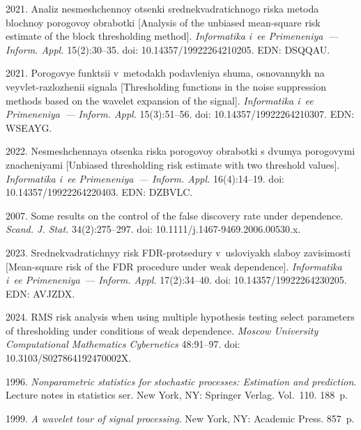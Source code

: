 \begin{multicols}{2}
{{\begin{thebibliography}{99}
 2021.
Analiz nesmeshchennoy otsenki srednekvadratichnogo riska metoda blochnoy po\-ro\-go\-voy obrabotki 
[Analysis of the unbiased mean-square risk estimate of the block thresholding method]. 
\textit{Informatika i~ee Primeneniya~--- Inform. Appl.} 15(2):30--35.
doi: 10.14357/19922264210205. EDN: DSQQAU.

 2021.
Porogovye funktsii v~metodakh podavleniya shuma, osnovannykh na veyvlet-razlozhenii signala 
[Thresholding functions in the noise suppression methods based on the wavelet expansion of the signal]. 
\textit{Informatika i~ee Primeneniya~--- Inform. Appl.} 15(3):51--56.
doi: 10.14357/19922264210307. EDN: WSEAYG.

 2022.
Nesmeshchennaya otsenka riska porogovoy obrabotki s dvumya porogovymi znacheniyami [Unbiased thresholding risk estimate with two threshold values]. 
\textit{Informatika i~ee Primeneniya~--- Inform. Appl.} 16(4):14--19.
doi: 10.14357/19922264220403. EDN: DZBVLC.

 2007. Some results on the control of the false discovery rate under dependence. 
\textit{Scand. J. Stat.} 34(2):275--297. 
doi: 10.1111/j.1467-9469.2006.00530.x.

 2023.
Sred\-ne\-kvad\-ra\-tich\-nyy risk FDR-protsedury v~usloviyakh slaboy za\-vi\-si\-mosti [Mean-square risk of the FDR procedure under weak dependence]. 
\textit{Informatika i~ee Primeneniya~--- Inform. Appl.} 17(2):34--40.
doi: 10.14357/19922264230205. EDN: AVJZDX.

 2024. 
RMS risk analysis when using multiple hypothesis testing select parameters of thresholding under conditions of weak dependence. 
\textit{Moscow University Computational Mathematics Cybernetics} 48:91--97. 
doi: 10.3103/S027864192470002X.

 1996. 
\textit{Nonparametric statistics for stochastic processes: Estimation and prediction}. 
Lecture notes in statistics ser. New York, NY: Springer Verlag. Vol.~110. 188~p.

 1999. 
\textit{A wavelet tour of signal processing}. New York, NY: Academic Press. 857~p.


\end{thebibliography}}}
\end{multicols}
